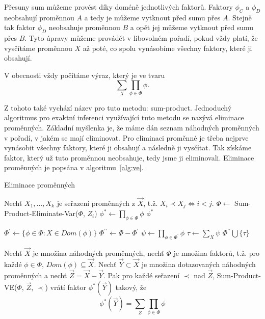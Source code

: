 Přesuny sum můžeme provést díky doméně jednotlivých faktorů.
Faktory $\phi_C$ a $\phi_D$ neobsahují proměnnou $A$ a tedy je můžeme vytknout před sumu přes $A$.
Stejně tak faktor $\phi_D$ neobsahuje proměnnou $B$ a opět jej můžeme vytknout před sumu přes $B$.
Tyto úpravy můžeme provádět v libovolném pořadí, pokud vždy platí, že vysčítáme proměnnou $X$ až poté, co spolu vynásobíme všechny faktory, které ji obsahují.

V obecnosti vždy počítáme výraz, který je ve tvaru
\[
\sum_X \prod_{\phi \in \Phi} \phi.
\]

Z tohoto také vychází název pro tuto metodu: sum-product.
Jednoduchý algoritmus pro exaktní inferenci využívající tuto metodu se nazývá eliminace proměnných.
Základní myšlenka je, že máme dán seznam náhodných proměnných v pořadí, v jakém se mají eliminovat.
Pro eliminaci proměnné je třeba nejprve vynásobit všechny faktory, které ji obsahují a následně ji vysčítat.
Tak získáme faktor, který už tuto proměnnou neobsahuje, tedy jsme ji eliminovali.
Eliminace proměnných je popsána v algoritmu~\ref{alg:ve}.

\begin{algorithm}[H]
\caption{Eliminace proměnných}
\label{alg:ve}
\begin{algorithmic}
\State

\State Nechť $X_1, \dots, X_k$ je seřazení proměnných z $\vec{X}$, t.ž. $X_i \prec X_j \Leftrightarrow i < j$.
	\State $\Phi \gets$ Sum-Product-Eliminate-Var($\Phi$, $Z_i$)
\EndFor
\State $\phi^* \gets \prod_{\phi \in \Phi} \phi$
\State \Return $\phi^*$
\EndFunction
\State
{}
\State

\State $\Phi^\prime \gets \{\phi \in \Phi: X \in Dom(\phi)\}$
\State $\Phi^{\prime \prime} \gets \Phi - \Phi^\prime$
\State $\psi \gets \prod_{\phi \in \Phi^\prime} \phi$
\State $\tau \gets \sum_X \psi$
\State \Return $\Phi^{\prime\prime} \bigcup \{\tau\}$
\EndFunction
\end{algorithmic}
\end{algorithm}

Nechť $\vec{X}$ je množina náhodných proměnných, nechť $\Phi$ je množina faktorů, t.ž. pro každé $\phi \in \Phi$, $Dom(\phi) \subseteq \vec{X}$.
Nechť $\vec{Y} \subset \vec{X}$ je množina dotazovaných náhodných proměnných a nechť $\vec{Z} = \vec{X} - \vec{Y}$.
Pak pro každé seřazení $\prec$ nad $\vec{Z}$, Sum-Product-VE($\Phi$, $\vec{Z}$, $\prec$) vrátí faktor $\phi^*(\vec{Y})$ takový, že
\[
\phi^*(\vec{Y}) = \sum_Z \prod_{\phi \in \Phi} \phi
\]

